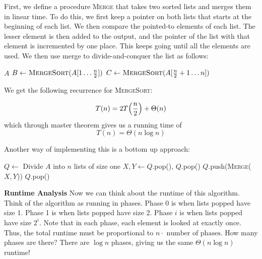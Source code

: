 \begin{algothm}[MergeSort]

    First, we define a procedure \textsc{Merge} that takes two sorted lists and merges them in linear time. To do this, we first keep a pointer on both lists that starts at the beginning of each list.
    We then compare the pointed-to elements of each list. The lesser element is then added to the output, and the pointer of the list with that element is incremented
    by one place. This keeps going until all the elements are used. We then use merge to divide-and-conquer the list as follows:
    \begin{algorithmic}
            \State \Return $A$
        \EndIf
        \State $B \gets \Call{MergeSort}{A[1 \dots \frac{n}{2}]}$
        \State $C \gets \Call{MergeSort}{A[\frac{n}{2} + 1 \dots n]}$
        \State \Return {}
    \EndFunction
    \end{algorithmic}

    We get the following recurrence for \textsc{MergeSort}:

    \[ T(n) = 2 T\qty(\frac{n}{2}) + \Theta(n) \] which through master theorem gives us a running time of
    \[T(n) = \Theta(n \log n) \]
\end{algothm}

Another way of implementing this is a bottom up approach:

\begin{algothm} 
    \begin{algorithmic}
            \State $Q \gets $ Divide $A$ into $n$ lists of size one
                \State $X, Y \gets Q$.pop(), $Q$.pop()
                \State $Q$.push(\textsc{Merge}($X, Y$))
            \EndWhile
            \State \Return $Q$.pop()
        \EndFunction
    \end{algorithmic}

    \textbf{Runtime Analysis}
    Now we can think about the runtime of this algorithm. Think of the algorithm as running in phases. Phase 0 is when lists popped have size 1.
    Phase 1 is when lists popped have size 2. Phase $i$ is when lists popped have size $2^i$. Note that in each phase, each element is looked at exactly once. Thus,
    the total runtime must be proportional to $n \cdot \text{ number of phases}$. How many phases are there? There are $\log n$ phases, giving us
    the same $\Theta(n \log n)$ runtime!
\end{algothm}


